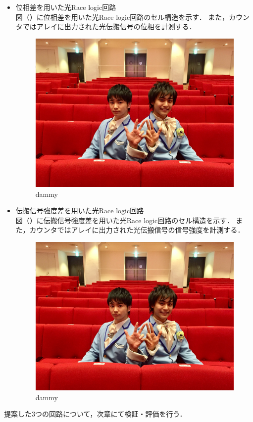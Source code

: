 \begin{itemize}
\item 位相差を用いた光Race logic回路\\
図（）に位相差を用いた光Race logic回路のセル構造を示す．
また，カウンタではアレイに出力された光伝搬信号の位相を計測する．
\begin{figure}[t!]
\begin{center}
\includegraphics[keepaspectratio,scale=0.05]{fig/dammy.jpg}
\caption{dammy}
\label{dammy}
\end{center}
\end{figure}

\item 伝搬信号強度差を用いた光Race logic回路\\
図（）に伝搬信号強度差を用いた光Race logic回路のセル構造を示す．
また，カウンタではアレイに出力された光伝搬信号の信号強度を計測する．
\begin{figure}[t!]
\begin{center}
\includegraphics[keepaspectratio,scale=0.05]{fig/dammy.jpg}
\caption{dammy}
\label{dammy}
\end{center}
\end{figure}

\end{itemize}

提案した3つの回路について，次章にて検証・評価を行う．

